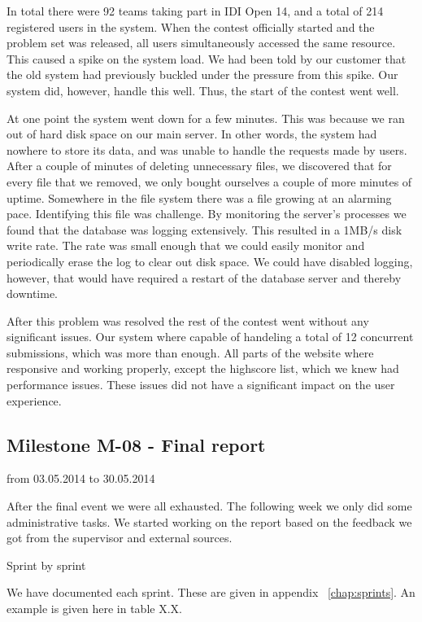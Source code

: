 In total there were 92 teams taking part in IDI Open 14, and a total of
214 registered users in the system. When the contest officially started
and the problem set was released, all users simultaneously accessed
the same resource. This caused a spike on the system load. We had been told
by our customer that the old system had previously buckled under the
pressure from this spike. Our system did, however, handle this well. 
Thus, the start of the contest went well. 




At one point the system went down for a few minutes. This was because we
ran out of hard disk space on our main server. In other words, the
system had nowhere to store its data, and was unable to handle the
requests made by users. After a couple of minutes of deleting
unnecessary files, we discovered that for every file that we removed, we
only bought ourselves a couple of more minutes of uptime. Somewhere in
the file system there was a file growing at an alarming pace. 
Identifying this file was challenge. By monitoring the
server's processes we found that the database was logging extensively. 
This resulted in a 1MB/s disk write rate. The rate was small enough that
we could easily monitor and periodically erase the log to clear out
disk space. We could have disabled logging, however, that would have
required a restart of the database server and thereby downtime. 




After this problem was resolved the rest of the contest went without any
significant issues. Our system where capable of handeling a total of 12
concurrent submissions, which was more than enough. All parts of the website where
responsive and working properly, except the highscore list, which we
knew had performance issues. These issues did not have a significant
impact on the user experience.




\subsection{Milestone M-08 - Final report}
\label{sec:M08}
from 03.05.2014 to 30.05.2014

After the final event we were all exhausted. The following week we only
did some administrative tasks. We started working on the report based on 
the feedback we got from the supervisor and external sources. 




Sprint by sprint

We have documented each sprint. These are given in appendix ~\ref{chap:sprints}. An
example is given here in table X.X.\newline

